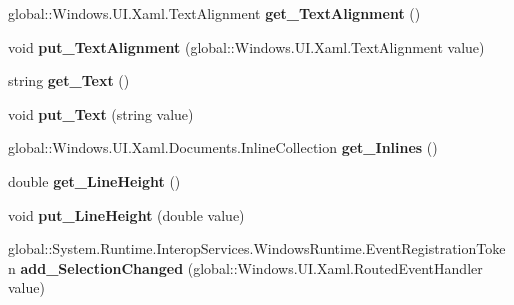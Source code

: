 \begin{DoxyCompactItemize}
global\+::\+Windows.\+U\+I.\+Xaml.\+Text\+Alignment {\bfseries get\+\_\+\+Text\+Alignment} ()
\item 
\mbox{\label{interface_windows_1_1_u_i_1_1_xaml_1_1_controls_1_1_i_text_block_aec1946ac3a3d6391c36750affe93432d}} 
void {\bfseries put\+\_\+\+Text\+Alignment} (global\+::\+Windows.\+U\+I.\+Xaml.\+Text\+Alignment value)
\item 
\mbox{\label{interface_windows_1_1_u_i_1_1_xaml_1_1_controls_1_1_i_text_block_a582d57058231ec6b50d2a938c3a978bc}} 
string {\bfseries get\+\_\+\+Text} ()
\item 
\mbox{\label{interface_windows_1_1_u_i_1_1_xaml_1_1_controls_1_1_i_text_block_a533b263e3487949e055f809bb25ece2f}} 
void {\bfseries put\+\_\+\+Text} (string value)
\item 
\mbox{\label{interface_windows_1_1_u_i_1_1_xaml_1_1_controls_1_1_i_text_block_a7234cc32a3da58efce8a882b5d2f996e}} 
global\+::\+Windows.\+U\+I.\+Xaml.\+Documents.\+Inline\+Collection {\bfseries get\+\_\+\+Inlines} ()
\item 
\mbox{\label{interface_windows_1_1_u_i_1_1_xaml_1_1_controls_1_1_i_text_block_a29846e44fd22f40af0b4b7d83f9e298d}} 
double {\bfseries get\+\_\+\+Line\+Height} ()
\item 
\mbox{\label{interface_windows_1_1_u_i_1_1_xaml_1_1_controls_1_1_i_text_block_a303a08f111a62df9e5b76472112e914c}} 
void {\bfseries put\+\_\+\+Line\+Height} (double value)
\item 
\mbox{\label{interface_windows_1_1_u_i_1_1_xaml_1_1_controls_1_1_i_text_block_af727476045815cf9cc9cf515d6d80a24}} 
global\+::\+System.\+Runtime.\+Interop\+Services.\+Windows\+Runtime.\+Event\+Registration\+Token {\bfseries add\+\_\+\+Selection\+Changed} (global\+::\+Windows.\+U\+I.\+Xaml.\+Routed\+Event\+Handler value)

\end{DoxyCompactItemize}
